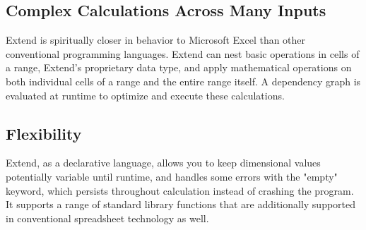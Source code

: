 	\subsection{Complex Calculations Across Many Inputs}
	Extend is spiritually closer in behavior to Microsoft Excel than other conventional programming languages. Extend can nest basic operations in cells of a range, Extend's proprietary data type, and apply mathematical operations on both individual cells of a range and the entire range itself. A dependency graph is evaluated at runtime to optimize and execute these calculations.

	\subsection{Flexibility}
	Extend, as a declarative language, allows you to keep dimensional values potentially variable until runtime, and handles some errors with the "empty" keyword, which persists throughout calculation instead of crashing the program. It supports a range of standard library functions that are additionally supported in conventional spreadsheet technology as well.
